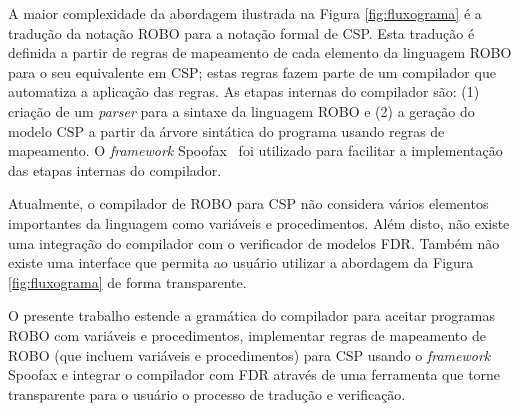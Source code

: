 A maior complexidade da abordagem ilustrada na Figura \ref{fig:fluxograma} é a tradução da notação ROBO para a notação formal de CSP. Esta tradução é definida a partir de regras de mapeamento de cada elemento da linguagem ROBO para o seu equivalente em CSP; estas regras fazem parte de um compilador que automatiza a aplicação das regras. 
As etapas internas do compilador são: (1) criação de um \textit{parser} para a sintaxe da linguagem ROBO e (2) a geração do modelo CSP a partir da árvore sintática do programa usando regras de mapeamento. 
O \textit{framework} Spoofax~\cite{KatsSpoofax} foi utilizado para facilitar a implementação das etapas internas do compilador. 

Atualmente, o compilador de ROBO para CSP não considera vários elementos importantes da linguagem como variáveis e procedimentos. Além disto, não existe uma integração do compilador com o verificador de modelos FDR. Também não existe uma interface que permita ao usuário utilizar a abordagem da Figura \ref{fig:fluxograma} de forma transparente. 

O presente trabalho estende a gramática do compilador para aceitar programas ROBO com variáveis e procedimentos, implementar regras de mapeamento de ROBO (que incluem variáveis e procedimentos) para CSP usando o \textit{framework} Spoofax  e integrar o compilador com FDR através de uma ferramenta que torne transparente para o usuário o processo de tradução e verificação.

